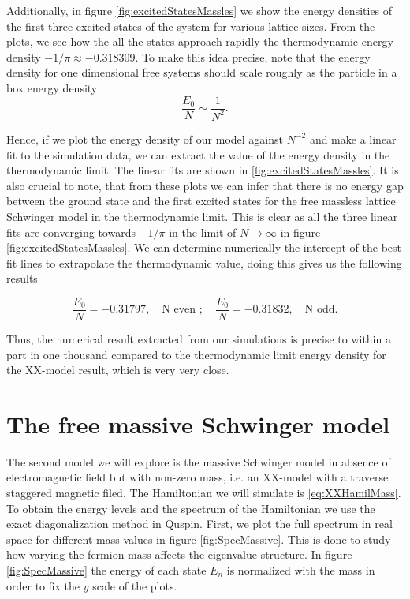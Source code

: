 Additionally, in figure \ref{fig:excitedStatesMassles} we show the energy densities of the first three excited states of the system for various lattice sizes. From the plots, we see how the all the states approach rapidly the thermodynamic energy density $-1/\pi\approx-0.318309$. To make this idea precise, note that the energy density for one dimensional free systems should scale roughly as the particle in a box energy density $$\frac{E_0}{N}\sim \frac{1}{N^2}.$$ 

Hence, if we plot the energy density of our model against $N^{-2}$ and make a linear fit to the simulation data, we can extract the value of the energy density in the thermodynamic limit. The linear fits are shown in \ref{fig:excitedStatesMassles}. It is also crucial to note, that from these plots we can infer that there is no energy gap between the ground state and the first excited states for the free massless lattice Schwinger model in the thermodynamic limit. This is clear as all the three linear fits are converging towards $-1/\pi$ in the limit of $N\to\infty$ in figure \ref{fig:excitedStatesMassles}. We can determine numerically the intercept of the best fit lines to extrapolate the thermodynamic value, doing this gives us the following results

\begin{equation}
\frac{E_0}{N} = -0.31797, \quad \text{N even };\quad \frac{E_0}{N} = -0.31832, \quad \text{N odd}.
\end{equation}


Thus, the numerical result extracted from our simulations is precise to within a part in one thousand compared to the thermodynamic limit energy density for the XX-model result, which is very very close. 



\section{The free massive Schwinger model}

The second model we will explore is the massive Schwinger model in absence of electromagnetic field but with non-zero mass, i.e. an XX-model with a traverse staggered magnetic filed. The Hamiltonian we will simulate is \ref{eq:XXHamilMass}. To obtain the energy levels and the spectrum of the Hamiltonian we use the exact diagonalization method in Quspin. First, we plot the full spectrum in real space for different mass values in figure \ref{fig:SpecMassive}. This is done to study how varying the fermion mass affects the eigenvalue structure. In figure \ref{fig:SpecMassive} the energy of each state $E_n$ is normalized with the mass in order to fix the $y$ scale of the plots.

